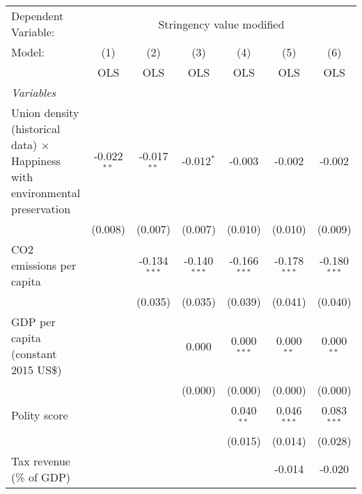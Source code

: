 
\begingroup
\centering
\begin{tabular}{lcccccc}
   \toprule
   Dependent Variable: & \multicolumn{6}{c}{Stringency value modified}\\
   Model:                                                                              & (1)           & (2)            & (3)            & (4)            & (5)            & (6)\\  
                                                                                       &  OLS          & OLS            & OLS            & OLS            & OLS            & OLS\\  
   \midrule
   \emph{Variables}\\
   Union density (historical data) $\times$ Happiness with environmental preservation  & -0.022$^{**}$ & -0.017$^{**}$  & -0.012$^{*}$   & -0.003         & -0.002         & -0.002\\   
                                                                                       & (0.008)       & (0.007)        & (0.007)        & (0.010)        & (0.010)        & (0.009)\\   
   CO2 emissions per capita                                                            &               & -0.134$^{***}$ & -0.140$^{***}$ & -0.166$^{***}$ & -0.178$^{***}$ & -0.180$^{***}$\\   
                                                                                       &               & (0.035)        & (0.035)        & (0.039)        & (0.041)        & (0.040)\\   
   GDP per capita (constant 2015 US\$)                                                 &               &                & 0.000          & 0.000$^{***}$  & 0.000$^{**}$   & 0.000$^{**}$\\   
                                                                                       &               &                & (0.000)        & (0.000)        & (0.000)        & (0.000)\\   
   Polity score                                                                        &               &                &                & 0.040$^{**}$   & 0.046$^{***}$  & 0.083$^{***}$\\   
                                                                                       &               &                &                & (0.015)        & (0.014)        & (0.028)\\   
   Tax revenue (\% of GDP)                                                             &               &                &                &                & -0.014         & -0.020\\   

\end{tabular}
